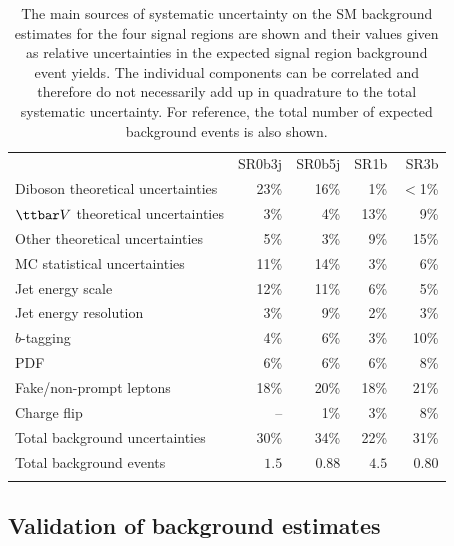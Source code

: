 \begin{table}[h!]
\begin{center}
\caption{The main sources of systematic uncertainty on the SM background estimates for the four signal regions are shown 
and their values given as relative uncertainties in the expected signal region background event yields. 
The individual components can be correlated and therefore do not necessarily add up in quadrature to the total systematic uncertainty.
For reference, the total number of expected background events is also shown.
}
\label{tab:SR_syst}
{\small
\begin{tabular}{lrrrr}
\noalign{\smallskip}\hline\hline\noalign{\smallskip}
         & SR0b3j         & SR0b5j     & SR1b & SR3b     \\[-0.05cm]
\noalign{\smallskip}\hline\hline\noalign{\smallskip}
Diboson theoretical uncertainties    & 23\%  &  16\%   &  1\%  &$<$1\%   \\
$\ttbar V$ theoretical uncertainties & 3\%   &  4\%    & 13\%  &  9\%   \\
Other theoretical uncertainties      & 5\%   &  3\%    &  9\%  & 15\%   \\
\noalign{\smallskip}\hline\noalign{\smallskip}
MC statistical uncertainties         & 11\%  &  14\%   &  3\%  &  6\%   \\
\noalign{\smallskip}\hline\noalign{\smallskip}
Jet energy scale        & 12\%   &  11\%  & 6\%    & 5\%   \\
Jet energy resolution   & 3\%    &  9\%   & 2\%    & 3\%   \\
$b$-tagging             & 4\%    &  6\%   & 3\%    & 10\%   \\
PDF                     & 6\%    &  6\%   & 6\%    & 8\%   \\
Fake/non-prompt leptons & 18\%    &  20\%   & 18\%   & 21\%   \\
Charge flip             & --     & 1\% & 3\%    & 8\%   \\
\noalign{\smallskip}\hline\noalign{\smallskip}
Total background uncertainties & 30\%   & 34\%   & 22\%   & 31\%   \\
\noalign{\smallskip}\hline\hline\noalign{\smallskip}
Total background events & $1.5$ & $0.88$ & $4.5$ & $0.80$\\
\noalign{\smallskip}\hline\hline\noalign{\smallskip}
\end{tabular}
}
\end{center}
\end{table}

\subsection{Validation of background estimates}
\label{sec:valid}


